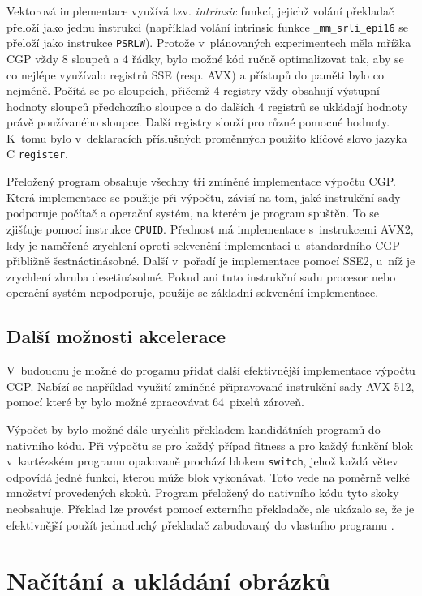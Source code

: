 Vektorová implementace využívá tzv. \emph{intrinsic} funkcí, jejichž volání překladač přeloží jako jednu instrukci (například volání intrinsic funkce \texttt{\_mm\_srli\_epi16} se přeloží jako instrukce \texttt{PSRLW}). Protože v~plánovaných experimentech měla mřížka CGP vždy 8 sloupců a 4 řádky, bylo možné kód ručně optimalizovat tak, aby se co nejlépe využívalo registrů SSE (resp. AVX) a přístupů do paměti bylo co nejméně. Počítá se po sloupcích, přičemž 4 registry vždy obsahují výstupní hodnoty sloupců předchozího sloupce a do dalších 4 registrů se ukládají hodnoty právě používaného sloupce. Další registry slouží pro různé pomocné hodnoty. K~tomu bylo v~deklaracích příslušných proměnných použito klíčové slovo jazyka C \texttt{register}.

Přeložený program obsahuje všechny tři zmíněné implementace výpočtu CGP. Která implementace se použije při výpočtu, závisí na tom, jaké instrukční sady podporuje počítač a operační systém, na kterém je program spuštěn. To se zjišťuje pomocí instrukce \texttt{CPUID}. Přednost má implementace s~instrukcemi AVX2, kdy je naměřené zrychlení oproti sekvenční implementaci u~standardního CGP přibližně šestnáctinásobné. Další v~pořadí je implementace pomocí SSE2, u~níž je zrychlení zhruba desetinásobné. Pokud ani tuto instrukční sadu procesor nebo operační systém nepodporuje, použije se základní sekvenční implementace.

\subsection{Další možnosti akcelerace}

V~budoucnu je možné do progamu přidat další efektivnější implementace výpočtu CGP. Nabízí se například využití zmíněné připravované instrukční sady AVX-512, pomocí které by bylo možné zpracovávat 64~pixelů zároveň.

Výpočet by bylo možné dále urychlit překladem kandidátních programů do nativního kódu. Při výpočtu se pro každý případ fitness a pro každý funkční blok v~kartézském programu opakovaně prochází blokem \texttt{switch}, jehož každá větev odpovídá jedné funkci, kterou může blok vykonávat. Toto vede na poměrně velké množství provedených skoků. Program přeložený do nativního kódu tyto skoky neobsahuje. Překlad lze provést pomocí externího překladače, ale ukázalo se, že je efektivnější použít jednoduchý překladač zabudovaný do vlastního programu \cite{VasicekCompiler}.

\section{Načítání a ukládání obrázků}
\label{secImplImages}

